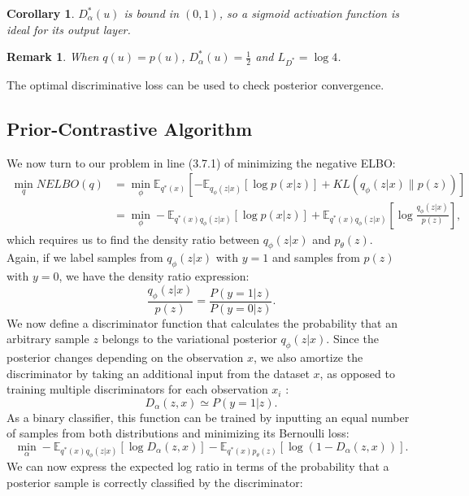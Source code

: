 \documentclass[honours,12pt]{unswthesis}
\newcommand{\E}{\mathbb{E}}
\newtheorem{corollary}[theorem]{Corollary}
\newtheorem{remark}[theorem]{Remark}
\numberwithin{equation}{section}
\theoremstyle{definition}
\begin{document}
\begin{corollary}
$D^*_\alpha(u)$ is bound in $(0,1)$, so a sigmoid activation function is ideal for its output layer.
\end{corollary}
\begin{remark}
When $q(u)=p(u)$, $D^*_\alpha(u)=\frac{1}{2}$ and $L_{D^*}=\log 4$.
\end{remark}
The optimal discriminative loss can be used to check posterior convergence.
\subsection{Prior-Contrastive Algorithm}
We now turn to our problem in line (3.7.1) of minimizing the negative ELBO:
\begin{align}
\min_{q} NELBO(q)&=\min_{\phi}\mathbb{E}_{q^*(x)}\left[-\E_{q_\phi(z|x)}[\log p(x|z)]+KL(q_\phi(z|x)\|p(z))\right]\nonumber\\
&=\min_\phi -\mathbb{E}_{q^*(x)q_\phi(z|x)}[\log p(x|z)]+\mathbb{E}_{q^*(x)q_\phi(z|x)}\left[\log \frac{q_\phi(z|x)}{p(z)}\right],
\end{align}
which requires us to find the density ratio between $q_\phi(z|x)$ and $p_\theta(z)$.\\
Again, if we label samples from $q_\phi(z|x)$ with $y=1$ and samples from $p(z)$ with $y=0$, we have the density ratio expression:
\[\frac{q_\phi(z|x)}{p(z)}=\frac{P(y=1|z)}{P(y=0|z)}.\]
We now define a discriminator function that calculates the probability that an arbitrary sample $z$ belongs to the variational posterior $q_\phi(z|x)$. Since the posterior changes depending on the observation $x$, we also amortize the discriminator by taking an additional input from the dataset $x$, as opposed to training multiple discriminators for each observation $x_i$ :
\[D_\alpha(z,x)\simeq P(y=1|z).\]
As a binary classifier, this function can be trained by inputting an equal number of samples from both distributions and minimizing its Bernoulli loss:
\begin{equation}
\min_\alpha -\mathbb{E}_{q^*(x)q_\phi(z|x)}[\log D_\alpha(z,x)]-\mathbb{E}_{q^*(x)p_\theta(z)}[\log (1-D_\alpha(z,x))].
\end{equation}
We can now express the expected log ratio in terms of the probability that a posterior sample is correctly classified by the discriminator:
\end{document}
